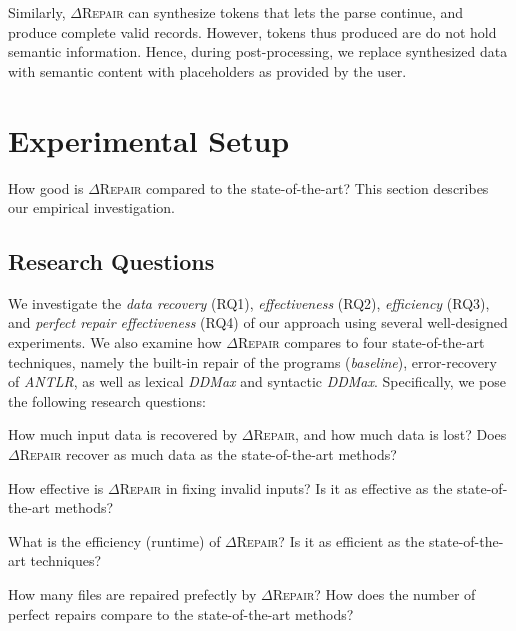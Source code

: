 \documentclass[acmsmall,screen,review,anonymous]{acmart}
\newcommand{\approach}{\textsc{$\Delta$Repair}\xspace}
\newcommand{\ddmax}{\textit{DDMax}\xspace}
\newcommand{\drepair}{\approach}
\begin{document}
Similarly,
\drepair can synthesize tokens that lets the parse continue, and produce
complete valid records. However, tokens thus produced are do not hold semantic information.
Hence, during post-processing, we replace synthesized data with semantic content
with placeholders as provided by the user.

\section{Experimental Setup}
\label{sec:experimental-setup}

How good is \drepair compared to the state-of-the-art? This section describes
our empirical investigation.

\subsection{Research Questions} 
We investigate the \textit{data recovery} (RQ1), \textit{effectiveness} (RQ2), 
\textit{efficiency} (RQ3),
and \textit{perfect repair effectiveness} (RQ4) of our approach using several well-designed experiments. %
We also examine how \approach compares to four state-of-the-art techniques, 
namely the built-in repair of the programs (\textit{baseline}), error-recovery of \textit{ANTLR}, as well as 
lexical \ddmax and syntactic 
\ddmax. Specifically, we pose the following research questions:

\begin{description}[labelwidth=!, labelindent=15pt]

\item[RQ1: Data Recovery and Data Loss.]
How much input data is recovered by \approach, and how much data is lost? %
Does \approach recover as much data as 
the state-of-the-art methods?

  \item[RQ2: Effectiveness.]  %
How effective is \approach in fixing invalid inputs? Is it as effective as the state-of-the-art methods?

\item[RQ3: Efficiency.] What is the efficiency (runtime) of
\approach? Is it as efficient as the state-of-the-art techniques?

\item[RQ4: Perfect Repair.] How many files are repaired prefectly by
\approach? How does the number of perfect repairs compare to the state-of-the-art methods?

\end{description}
\end{document}
